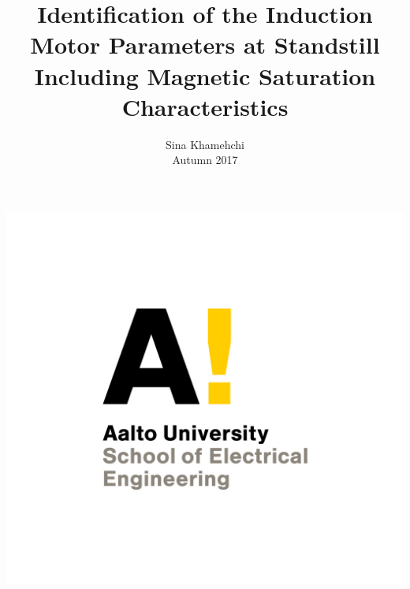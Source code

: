 \documentclass[11pt,aspectratio=169]{beamer}
\begin{document}
	
\subtitle{}
\title{Identification of the Induction Motor Parameters at Standstill Including Magnetic Saturation Characteristics}

\author[]{Sina Khamehchi\\ \vspace{.5em}
Autumn 2017}
\date{}
\begin{frame}
\includegraphics[scale=.45]{Aalto_ELEC_y.png}\vspace{-.5Em}
\titlepage
\vspace{-3Em}
\end{frame}

\end{document}
